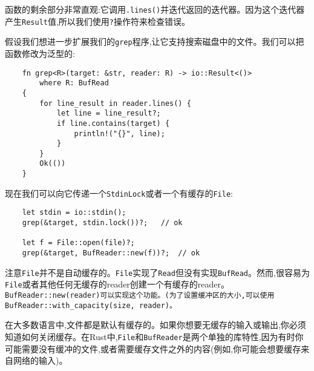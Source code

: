 函数的剩余部分非常直观:它调用\texttt{.lines()}并迭代返回的迭代器。因为这个迭代器产生\texttt{Result}值,所以我们使用\texttt{?}操作符来检查错误。

假设我们想进一步扩展我们的\texttt{grep}程序,让它支持搜索磁盘中的文件。我们可以把函数修改为泛型的:
\begin{verbatim}
    fn grep<R>(target: &str, reader: R) -> io::Result<()>
        where R: BufRead
    {
        for line_result in reader.lines() {
            let line = line_result?;
            if line.contains(target) {
                println!("{}", line);
            }
        }
        Ok(())
    }
\end{verbatim}

现在我们可以向它传递一个\texttt{StdinLock}或者一个有缓存的\texttt{File}:
\begin{verbatim}
    let stdin = io::stdin();
    grep(&target, stdin.lock())?;   // ok

    let f = File::open(file)?;
    grep(&target, BufReader::new(f))?;  // ok
\end{verbatim}

注意\texttt{File}并不是自动缓存的。\texttt{File}实现了\texttt{Read}但没有实现\texttt{BufRead}。然而,很容易为\texttt{File}或者其他任何无缓存的reader创建一个有缓存的reader。\texttt{BufReader::new(reader)可以实现这个功能。(为了设置缓冲区的大小,可以使用\texttt{BufReader::with\_capacity(size, reader)}。}

在大多数语言中,文件都是默认有缓存的。如果你想要无缓存的输入或输出,你必须知道如何关闭缓存。在Rust中,\texttt{File}和\texttt{BufReader}是两个单独的库特性,因为有时你可能需要没有缓冲的文件,或者需要缓存文件之外的内容(例如,你可能会想要缓存来自网络的输入)。

